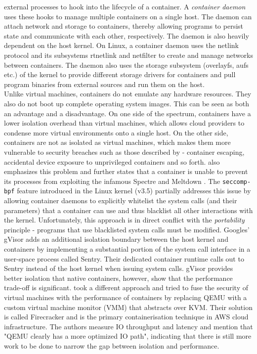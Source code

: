 \documentclass[english]{lni}
\begin{document}
external processes to hook into the lifecycle of a container. 
A \textit{container daemon} uses these hooks to manage multiple containers on a 
single host. The daemon can attach network and storage to containers, thereby 
allowing programs to persist state and communicate with each other, respectively.
The daemon is also heavily dependent on the host kernel.
On Linux, a container daemon uses the netlink protocol \cite{netlink-man-page} 
and its subsystems rtnetlink \cite{rtnetlink-man-page} 
and netfilter to create and manage networks between containers.
The daemon also uses the storage subsystem (overlayfs, aufs etc.) 
of the kernel to provide different storage drivers for containers and 
pull program binaries from external sources and run them on the host.\\
Unlike virtual machines, containers 
do not emulate any hardware resources. They also do not boot up complete 
operating system images. This can be seen as both an advantage and a 
disadvantage. 
On one side of the spectrum, containers have a lower isolation overhead 
than virtual machines, which allows cloud providers to condense more 
virtual environments onto a single host. On the other side, containers 
are not as isolated as virtual machines, 
which makes them more vulnerable to security breaches such as those 
described by \citeauthor{ncc-linux-conts} \cite{ncc-linux-conts} - 
container escaping, accidental device exposure to unprivileged containers
and so forth. \citeauthor{10.1145/3365199} \cite{10.1145/3365199} also 
emphasizes this problem and further states that a container is unable 
to prevent its processes from exploiting the infamous 
Spectre \cite{Kocher2018spectre} and Meltdown \cite{Lipp2018meltdown}. 
The \verb|seccomp-bpf| feature introduced in the Linux kernel (v3.5) partially 
addresses this issue by allowing container daemons to explicitly whitelist 
the system calls (and their parameters) that a container can use and thus 
blacklist all other interactions with the kernel. Unfortunately, this approach 
is in direct conflict with the \textit{portability} principle - 
programs that use blacklisted system calls must be modified. 
Googles' gVisor \cite{gvisor} adds an additional isolation boundary 
between the host kernel and containers by implementing a substantial portion
of the system call interface in a user-space process called Sentry. 
Their dedicated container runtime calls out to Sentry instead of the 
host kernel when issuing system calls. gVisor provides 
better isolation that native containers, however, 
\citeauthor{234857} \cite{234857} show that the performance trade-off 
is significant. \citeauthor{246288} \cite{246288} 
took a different approach and tried to fuse the security 
of virtual machines with the performance of containers by replacing QEMU with a  
custom virtual machine monitor (VMM) that abstracts over KVM.
Their solution is called Firecracker and is the primary containerisation 
technique in AWS cloud infrastructure. The authors measure IO throughput 
and latency and mention that "QEMU clearly has a more optimized IO path", 
indicating that there is still more work to be done to narrow the gap between 
isolation and performance.   
\end{document}
